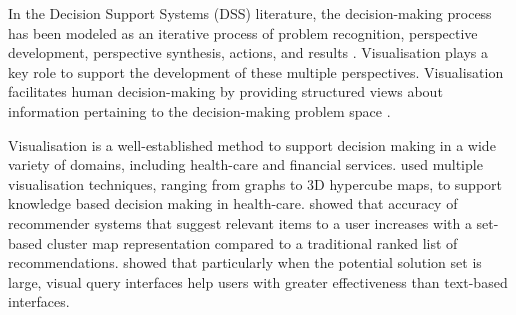 \documentclass[final,5p,times,twocolumn,authoryear]{elsarticle}
\begin{document}

In the Decision Support Systems (DSS) literature, the decision-making process has been modeled as an iterative process of problem recognition, perspective development, perspective synthesis, actions, and results \citep{park2016bicentric}. Visualisation plays a key role to support the development of these multiple perspectives. Visualisation facilitates human decision-making by providing structured views about information pertaining to the decision-making problem space \citep{shim2002past}. 

Visualisation is a well-established method to support decision making in a wide variety of domains, including health-care and financial services. \cite{abidi2001knowledge} used multiple visualisation techniques, ranging from graphs to 3D hypercube maps, to support knowledge based decision making in health-care. \cite{tiis} showed that accuracy of recommender systems that suggest relevant items to a user increases with a set-based cluster map representation compared to a traditional ranked list of recommendations. 
\cite{speier2003influence} showed that particularly when the potential solution set is large, visual query interfaces help users with greater effectiveness than text-based interfaces. 
\end{document}
